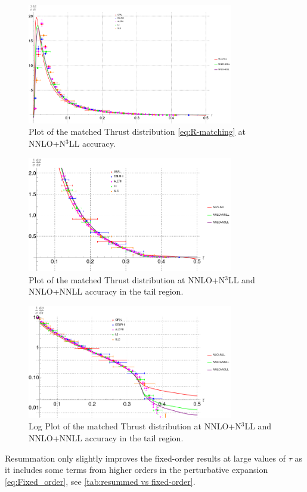 \documentclass[../Tesi_Jiahao_Miao_986136.tex]{subfiles}
\begin{document}
\begin{figure}
    \centering
    \includegraphics[width=0.8\textwidth]{figures/Matching.png}
    \caption{Plot of the matched Thrust distribution \cref{eq:R-matching} at NNLO+N$^3$LL accuracy.}
    \label{fig:Matching}
\end{figure}

\begin{figure}
    \centering
    \includegraphics[width=0.8\textwidth]{figures/matched_tail_region.png}
    \caption{Plot of the matched Thrust distribution at NNLO+N$^3$LL and NNLO+NNLL accuracy in the tail region.}
\end{figure}

\begin{figure}
    \centering
    \includegraphics[width=0.8\textwidth]{figures/matched_tail_region_logplot.png}
    \caption{Log Plot of the matched Thrust distribution at NNLO+N$^3$LL and NNLO+NNLL accuracy in the tail region.}
\end{figure}

Resummation only slightly improves the fixed-order results at large values of $\tau$ as it includes some terms from higher
orders in the perturbative expansion \cref{eq:Fixed_order}, see \cref{tab:resummed vs fixed-order}.
\end{document}

